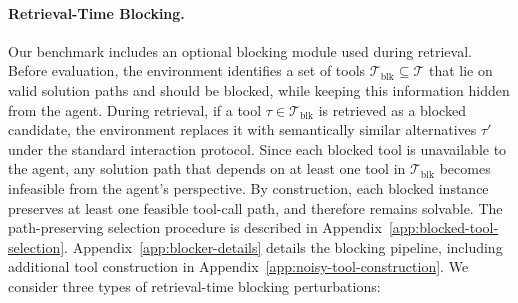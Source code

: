 

\paragraph{Retrieval-Time Blocking.}

Our benchmark includes an optional blocking module used during retrieval.
Before evaluation, the environment identifies a set of tools $\mathcal{T}_{\mathrm{blk}} \subseteq \mathcal{T}$ that lie on valid solution paths and should be blocked, while keeping this information hidden from the agent.
During retrieval, if a tool $\tau \in \mathcal{T}_{\mathrm{blk}}$ is retrieved as a blocked candidate, the environment replaces it with semantically similar alternatives $\tau'$ under the standard interaction protocol.
Since each blocked tool is unavailable to the agent, any solution path that depends on at least one tool in $\mathcal{T}_{\mathrm{blk}}$ becomes infeasible from the agent's perspective.
By construction, each blocked instance preserves at least one feasible tool-call path, and therefore remains solvable.
The path-preserving selection procedure is described in Appendix~\ref{app:blocked-tool-selection}.
Appendix~\ref{app:blocker-details} details the blocking pipeline, including additional tool construction in Appendix~\ref{app:noisy-tool-construction}.
We consider three types of retrieval-time blocking perturbations:
    
